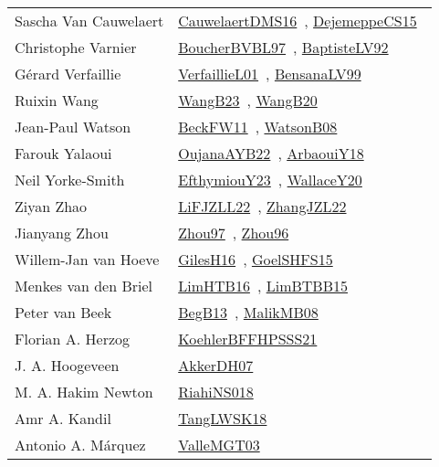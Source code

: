 {\begin{longtable}{p{4cm}p{20cm}}
Sascha Van Cauwelaert & \href{works/CauwelaertDMS16.pdf}{CauwelaertDMS16}~\cite{CauwelaertDMS16}, \href{works/DejemeppeCS15.pdf}{DejemeppeCS15}~\cite{DejemeppeCS15}\\
Christophe Varnier & \href{}{BoucherBVBL97}~\cite{BoucherBVBL97}, \href{works/BaptisteLV92.pdf}{BaptisteLV92}~\cite{BaptisteLV92}\\
G{\'{e}}rard Verfaillie & \href{works/VerfaillieL01.pdf}{VerfaillieL01}~\cite{VerfaillieL01}, \href{works/BensanaLV99.pdf}{BensanaLV99}~\cite{BensanaLV99}\\
Ruixin Wang & \href{works/WangB23.pdf}{WangB23}~\cite{WangB23}, \href{works/WangB20.pdf}{WangB20}~\cite{WangB20}\\
Jean{-}Paul Watson & \href{}{BeckFW11}~\cite{BeckFW11}, \href{works/WatsonB08.pdf}{WatsonB08}~\cite{WatsonB08}\\
Farouk Yalaoui & \href{works/OujanaAYB22.pdf}{OujanaAYB22}~\cite{OujanaAYB22}, \href{works/ArbaouiY18.pdf}{ArbaouiY18}~\cite{ArbaouiY18}\\
Neil Yorke{-}Smith & \href{works/EfthymiouY23.pdf}{EfthymiouY23}~\cite{EfthymiouY23}, \href{works/WallaceY20.pdf}{WallaceY20}~\cite{WallaceY20}\\
Ziyan Zhao & \href{works/LiFJZLL22.pdf}{LiFJZLL22}~\cite{LiFJZLL22}, \href{works/ZhangJZL22.pdf}{ZhangJZL22}~\cite{ZhangJZL22}\\
Jianyang Zhou & \href{works/Zhou97.pdf}{Zhou97}~\cite{Zhou97}, \href{works/Zhou96.pdf}{Zhou96}~\cite{Zhou96}\\
Willem{-}Jan van Hoeve & \href{works/GilesH16.pdf}{GilesH16}~\cite{GilesH16}, \href{works/GoelSHFS15.pdf}{GoelSHFS15}~\cite{GoelSHFS15}\\
Menkes van den Briel & \href{works/LimHTB16.pdf}{LimHTB16}~\cite{LimHTB16}, \href{works/LimBTBB15.pdf}{LimBTBB15}~\cite{LimBTBB15}\\
Peter van Beek & \href{}{BegB13}~\cite{BegB13}, \href{}{MalikMB08}~\cite{MalikMB08}\\
Florian A. Herzog & \href{works/KoehlerBFFHPSSS21.pdf}{KoehlerBFFHPSSS21}~\cite{KoehlerBFFHPSSS21}\\
J. A. Hoogeveen & \href{works/AkkerDH07.pdf}{AkkerDH07}~\cite{AkkerDH07}\\
M. A. Hakim Newton & \href{works/RiahiNS018.pdf}{RiahiNS018}~\cite{RiahiNS018}\\
Amr A. Kandil & \href{}{TangLWSK18}~\cite{TangLWSK18}\\
Antonio A. M{\'{a}}rquez & \href{works/ValleMGT03.pdf}{ValleMGT03}~\cite{ValleMGT03}\\

\end{longtable}}
